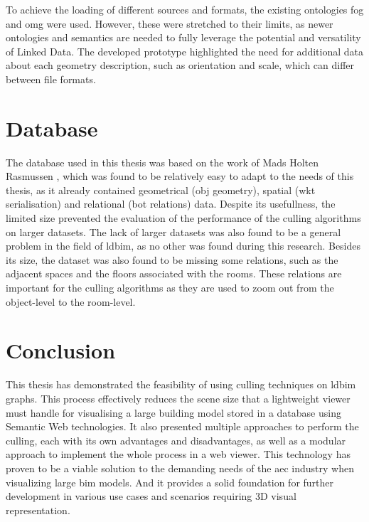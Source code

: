 To achieve the loading of different sources and formats, the existing ontologies \ac{fog} and \ac{omg} were used. However, these were stretched to their limits, as newer ontologies and semantics are needed to fully leverage the potential and versatility of Linked Data. The developed prototype highlighted the need for additional data about each geometry description, such as orientation and scale, which can differ between file formats.

\section{Database}
The database used in this thesis was based on the work of Mads Holten Rasmussen \cite{}, which was found to be relatively easy to adapt to the needs of this thesis, as it already contained geometrical (obj geometry), spatial (\ac{wkt} serialisation) and relational (\ac{bot} relations) data. Despite its usefullness, the limited size prevented the evaluation of the performance of the culling algorithms on larger datasets. The lack of larger datasets was also found to be a general problem in the field of \ac{ldbim}, as no other was found during this research. Besides its size, the dataset was also found to be missing some relations, such as the adjacent spaces and the floors associated with the rooms. These relations are important for the culling algorithms as they are used to zoom out from the object-level to the room-level.

\section{Conclusion}
This thesis has demonstrated the feasibility of using culling techniques on \ac{ldbim} graphs. This process effectively reduces the scene size that a lightweight viewer must handle for visualising a large building model stored in a database using Semantic Web technologies. It also presented multiple approaches to perform the culling, each with its own advantages and disadvantages, as well as a modular approach to implement the whole process in a web viewer. This technology has proven to be a viable solution to the demanding needs of the \ac{aec} industry when visualizing large \ac{bim} models. And it provides a solid foundation for further development in various use cases and scenarios requiring 3D visual representation.